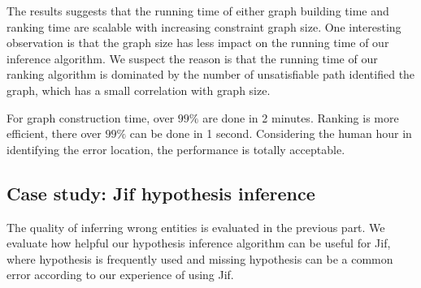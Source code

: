The results suggests that the running time of either graph building
time and ranking time are scalable with increasing constraint graph
size. One interesting observation is that the graph size has less
impact on the running time of our inference algorithm. We suspect the
reason is that the running time of our ranking algorithm is
dominated by the number of unsatisfiable path identified the graph,
which has a small correlation with graph size.

For graph construction time, over $99\%$ are done in 2 minutes.
Ranking is more efficient, there over $99\%$ can be done in 1 second.
Considering the human hour in identifying the error location, the
performance is totally acceptable.

\begin{table}
\end{table}

\subsection{Case study: Jif hypothesis inference}

The quality of inferring wrong entities is evaluated in the previous
part. We evaluate how helpful our hypothesis inference algorithm can
be useful for Jif, where hypothesis is frequently used and missing
hypothesis can be a common error according to our experience of using
Jif.

